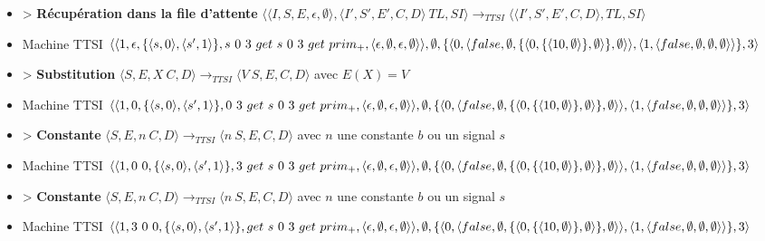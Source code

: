 \documentclass[10pt,a4paper]{article}
\begin{document}
\begin{itemize}
					\item[] > \textbf{Récupération dans la file d'attente} $\langle\langle I,S,E,\epsilon,\emptyset\rangle,\langle I',S',E',C,D\rangle~TL,SI\rangle 
					\longrightarrow_{TTSI} 
					\langle\langle I',S',E',C,D\rangle,TL,SI\rangle$
					\item[] Machine TTSI $\langle\langle 1,\epsilon,\{\langle s,0\rangle,\langle s',1\rangle\},s~0~3~get~s~0~3~get~prim_{+} ,\langle\epsilon,\emptyset,\epsilon,\emptyset\rangle\rangle,\emptyset,\{\langle 0,\langle false,\emptyset,\{\langle 0,\{\langle 10,\emptyset\rangle\},\emptyset\rangle\},\emptyset\rangle\rangle,\\\langle 1,\langle false,\emptyset,\emptyset,\emptyset\rangle\rangle\},3\rangle$ 
					\item[] > \textbf{Substitution} $\langle S,E,X~C,D\rangle
					\longrightarrow_{TTSI} 
					\langle V~S,E,C,D\rangle$ avec $E(X) = V$
					\item[] Machine TTSI $\langle\langle 1,0,\{\langle s,0\rangle,\langle s',1\rangle\},0~3~get~s~0~3~get~prim_{+} ,\langle\epsilon,\emptyset,\epsilon,\emptyset\rangle\rangle,\emptyset,\{\langle 0,\langle false,\emptyset,\{\langle 0,\{\langle 10,\emptyset\rangle\},\emptyset\rangle\},\emptyset\rangle\rangle,\\\langle 1,\langle false,\emptyset,\emptyset,\emptyset\rangle\rangle\},3\rangle$ 
					\item[] > \textbf{Constante} $\langle S,E,n~C,D\rangle 
					\longrightarrow_{TTSI} 
					\langle n~S,E,C,D\rangle$ avec $n$ une constante $b$ ou un signal $s$
					\item[] Machine TTSI $\langle\langle 1,0~0,\{\langle s,0\rangle,\langle s',1\rangle\},3~get~s~0~3~get~prim_{+} ,\langle\epsilon,\emptyset,\epsilon,\emptyset\rangle\rangle,\emptyset,\{\langle 0,\langle false,\emptyset,\{\langle 0,\{\langle 10,\emptyset\rangle\},\emptyset\rangle\},\emptyset\rangle\rangle,\\\langle 1,\langle false,\emptyset,\emptyset,\emptyset\rangle\rangle\},3\rangle$ 
					\item[] > \textbf{Constante} $\langle S,E,n~C,D\rangle 
					\longrightarrow_{TTSI} 
					\langle n~S,E,C,D\rangle$ avec $n$ une constante $b$ ou un signal $s$
					\item[] Machine TTSI $\langle\langle 1,3~0~0,\{\langle s,0\rangle,\langle s',1\rangle\},get~s~0~3~get~prim_{+} ,\langle\epsilon,\emptyset,\epsilon,\emptyset\rangle\rangle,\emptyset,\{\langle 0,\langle false,\emptyset,\{\langle 0,\{\langle 10,\emptyset\rangle\},\emptyset\rangle\},\emptyset\rangle\rangle,\\\langle 1,\langle false,\emptyset,\emptyset,\emptyset\rangle\rangle\},3\rangle$ 

\end{itemize}
\end{document}
